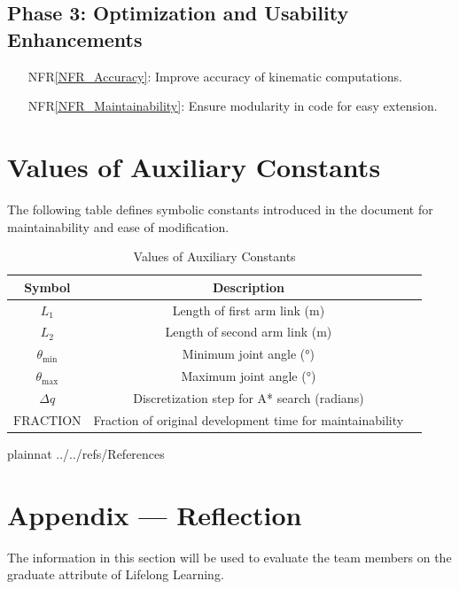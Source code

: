 \documentclass[12pt]{article}
\begin{document}
\subsection{Phase 3: Optimization and Usability Enhancements}
\begin{itemize}
    \item[NFR\ref{NFR_Accuracy}:] Improve accuracy of kinematic computations.
    \item[NFR\ref{NFR_Maintainability}:] Ensure modularity in code for easy extension.
\end{itemize}

\section{Values of Auxiliary Constants}

The following table defines symbolic constants introduced in the document for maintainability and ease of modification.

\begin{table}[h!]
\centering
\begin{tabular}{|c|c|c|}
\hline
\textbf{Symbol} & \textbf{Description}  \\
\hline
$L_1$ & Length of first arm link (\si{\metre})  \\
$L_2$ & Length of second arm link (\si{\metre}) \\
$\theta_{\min}$ & Minimum joint angle (\si{\degree})  \\
$\theta_{\max}$ & Maximum joint angle (\si{\degree}) \\
$\Delta q$ & Discretization step for A* search (radians)  \\
$\text{FRACTION}$ & Fraction of original development time for maintainability\\
\hline
\end{tabular}
\caption{Values of Auxiliary Constants}
\label{Table:AuxiliaryConstants}
\end{table}

\newpage

 {plainnat}
 {../../refs/References}

\newpage

\newpage{}
\section*{Appendix --- Reflection}


The information in this section will be used to evaluate the team members on the
graduate attribute of Lifelong Learning.  



\end{document}
